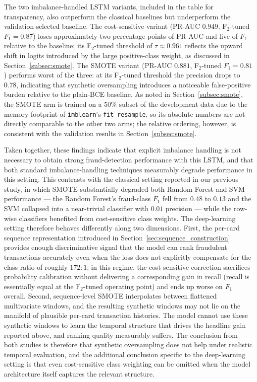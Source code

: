 \documentclass[oneside,12pt,parskip=half,american,numbers=noenddot]{scrreprt}
\begin{document}
The two imbalance-handled LSTM variants, included in the table for transparency, also outperform the classical baselines but underperform the validation-selected baseline. The cost-sensitive variant (PR-AUC $0.949$, F$_2$-tuned $F_1 = 0.87$) loses approximately two percentage points of PR-AUC and five of $F_1$ relative to the baseline; its F$_2$-tuned threshold of $\tau \approx 0.961$ reflects the upward shift in logits introduced by the large positive-class weight, as discussed in Section~\ref{subsec:smote}. The SMOTE variant (PR-AUC $0.881$, F$_2$-tuned $F_1 = 0.81$) performs worst of the three: at its F$_2$-tuned threshold the precision drops to $0.78$, indicating that synthetic oversampling introduces a noticeable false-positive burden relative to the plain-BCE baseline. As noted in Section~\ref{subsec:smote}, the SMOTE arm is trained on a $50\%$ subset of the development data due to the memory footprint of \texttt{imblearn}'s \texttt{fit\_resample}, so its absolute numbers are not directly comparable to the other two arms; the relative ordering, however, is consistent with the validation results in Section~\ref{subsec:smote}.

Taken together, these findings indicate that explicit imbalance handling is not necessary to obtain strong fraud-detection performance with this LSTM, and that both standard imbalance-handling techniques measurably degrade performance in this setting. This contrasts with the classical setting reported in our previous study, in which SMOTE substantially degraded both Random Forest and SVM performance — the Random Forest's fraud-class $F_1$ fell from $0.48$ to $0.13$ and the SVM collapsed into a near-trivial classifier with $0.01$ precision — while the row-wise classifiers benefited from cost-sensitive class weights. The deep-learning setting therefore behaves differently along two dimensions. First, the per-card sequence representation introduced in Section~\ref{sec:sequence_construction} provides enough discriminative signal that the model can rank fraudulent transactions accurately even when the loss does not explicitly compensate for the class ratio of roughly $172{:}1$; in this regime, the cost-sensitive correction sacrifices probability calibration without delivering a corresponding gain in recall (recall is essentially equal at the F$_2$-tuned operating point) and ends up worse on $F_1$ overall. Second, sequence-level SMOTE interpolates between flattened multivariate windows, and the resulting synthetic windows may not lie on the manifold of plausible per-card transaction histories. The model cannot use these synthetic windows to learn the temporal structure that drives the headline gain reported above, and ranking quality measurably suffers. The conclusion from both studies is therefore that synthetic oversampling does not help under realistic temporal evaluation, and the additional conclusion specific to the deep-learning setting is that even cost-sensitive class weighting can be omitted when the model architecture itself captures the relevant structure.
\end{document}
